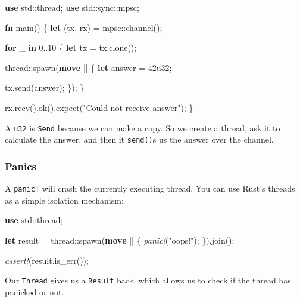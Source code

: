 \documentclass[a4paper,]{book}
\newenvironment{Shaded}{\begin{snugshade}}{\end{snugshade}}
\newcommand{\KeywordTok}[1]{\textcolor[rgb]{0.13,0.29,0.53}{\textbf{{#1}}}}
\newcommand{\DecValTok}[1]{\textcolor[rgb]{0.00,0.00,0.81}{{#1}}}
\newcommand{\StringTok}[1]{\textcolor[rgb]{0.31,0.60,0.02}{{#1}}}
\newcommand{\PreprocessorTok}[1]{\textcolor[rgb]{0.56,0.35,0.01}{\textit{{#1}}}}
\newcommand{\NormalTok}[1]{{#1}}
\begin{document}
\begin{Shaded}
\begin{Highlighting}[]
\KeywordTok{use} \NormalTok{std::thread;}
\KeywordTok{use} \NormalTok{std::sync::mpsc;}

\KeywordTok{fn} \NormalTok{main() \{}
    \KeywordTok{let} \NormalTok{(tx, rx) = mpsc::channel();}

    \KeywordTok{for} \NormalTok{_ }\KeywordTok{in} \DecValTok{0.}\NormalTok{.}\DecValTok{10} \NormalTok{\{}
        \KeywordTok{let} \NormalTok{tx = tx.clone();}

        \NormalTok{thread::spawn(}\KeywordTok{move} \NormalTok{|| \{}
            \KeywordTok{let} \NormalTok{answer = }\DecValTok{42u32}\NormalTok{;}

            \NormalTok{tx.send(answer);}
        \NormalTok{\});}
    \NormalTok{\}}

   \NormalTok{rx.recv().ok().expect(}\StringTok{"Could not receive answer"}\NormalTok{);}
\NormalTok{\}}
\end{Highlighting}
\end{Shaded}

A \texttt{u32} is \texttt{Send} because we can make a copy. So we create
a thread, ask it to calculate the answer, and then it \texttt{send()}s
us the answer over the channel.

\subsubsection{Panics}\label{panics}

A \texttt{panic!} will crash the currently executing thread. You can use
Rust's threads as a simple isolation mechanism:

\begin{Shaded}
\begin{Highlighting}[]
\KeywordTok{use} \NormalTok{std::thread;}

\KeywordTok{let} \NormalTok{result = thread::spawn(}\KeywordTok{move} \NormalTok{|| \{}
    \PreprocessorTok{panic!}\NormalTok{(}\StringTok{"oops!"}\NormalTok{);}
\NormalTok{\}).join();}

\PreprocessorTok{assert!}\NormalTok{(result.is_err());}
\end{Highlighting}
\end{Shaded}

Our \texttt{Thread} gives us a \texttt{Result} back, which allows us to
check if the thread has panicked or not.

\end{document}
